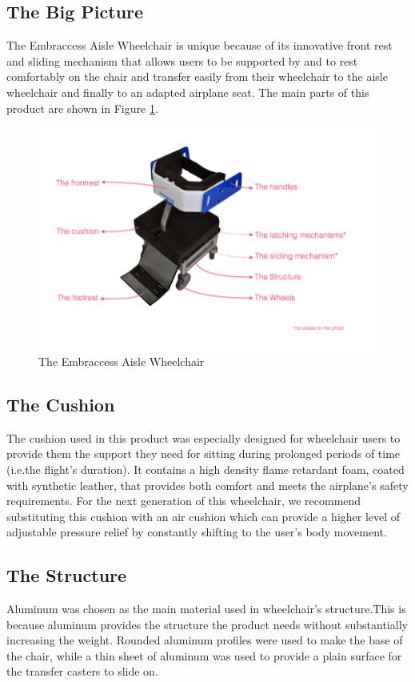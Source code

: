 \subsection{The Big Picture}

The Embraccess Aisle Wheelchair is unique because of its innovative front rest and sliding mechanism that allows users to be supported by and to rest comfortably on the chair and transfer easily from their wheelchair to the aisle wheelchair and finally to an adapted airplane seat. The main parts of this product are shown in Figure \ref{fig:wheelchair}. 

\begin{figure}[h]
\centering
\includegraphics[width=13cm]{images/AisleWheelchair1.png}
\caption{The Embraccess Aisle Wheelchair}
\label{fig:wheelchair}
\end{figure}


\subsection{The Cushion}

The cushion used in this product was especially designed for wheelchair users to provide them the support they need for sitting during prolonged periods of time (i.e.the  flight's duration). It contains a high density flame retardant foam, coated with synthetic leather, that provides both comfort and meets the airplane’s safety requirements. For the next generation of this wheelchair, we recommend substituting this cushion with an air cushion which can provide a higher level of adjustable pressure relief by constantly shifting to the user's body movement.

\subsection{The Structure}
Aluminum was chosen as the main material used in wheelchair’s  structure.This is because aluminum provides the structure the product needs without substantially increasing the weight. Rounded aluminum profiles were used to make the base of the chair, while a thin sheet of aluminum was used to provide a plain surface for the transfer casters to slide on.



